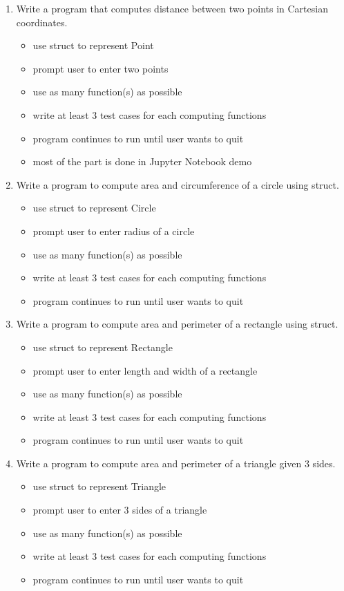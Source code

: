 \documentclass[11pt]{article}
\providecommand{\tightlist}{%
      \setlength{\itemsep}{0pt}\setlength{\parskip}{0pt}}
\begin{document}
\begin{enumerate}
\def\labelenumi{\arabic{enumi}.}
\tightlist
\item
  Write a program that computes distance between two points in Cartesian
  coordinates.

  \begin{itemize}
  \tightlist
  \item
    use struct to represent Point
  \item
    prompt user to enter two points
  \item
    use as many function(s) as possible
  \item
    write at least 3 test cases for each computing functions
  \item
    program continues to run until user wants to quit
  \item
    most of the part is done in Jupyter Notebook demo
  \end{itemize}
\item
  Write a program to compute area and circumference of a circle using
  struct.

  \begin{itemize}
  \tightlist
  \item
    use struct to represent Circle
  \item
    prompt user to enter radius of a circle
  \item
    use as many function(s) as possible
  \item
    write at least 3 test cases for each computing functions
  \item
    program continues to run until user wants to quit
  \end{itemize}
\item
  Write a program to compute area and perimeter of a rectangle using
  struct.

  \begin{itemize}
  \tightlist
  \item
    use struct to represent Rectangle
  \item
    prompt user to enter length and width of a rectangle
  \item
    use as many function(s) as possible
  \item
    write at least 3 test cases for each computing functions
  \item
    program continues to run until user wants to quit
  \end{itemize}
\item
  Write a program to compute area and perimeter of a triangle given 3
  sides.

  \begin{itemize}
  \tightlist
  \item
    use struct to represent Triangle
  \item
    prompt user to enter 3 sides of a triangle
  \item
    use as many function(s) as possible
  \item
    write at least 3 test cases for each computing functions
  \item
    program continues to run until user wants to quit
  \end{itemize}
\end{enumerate}
\end{document}
